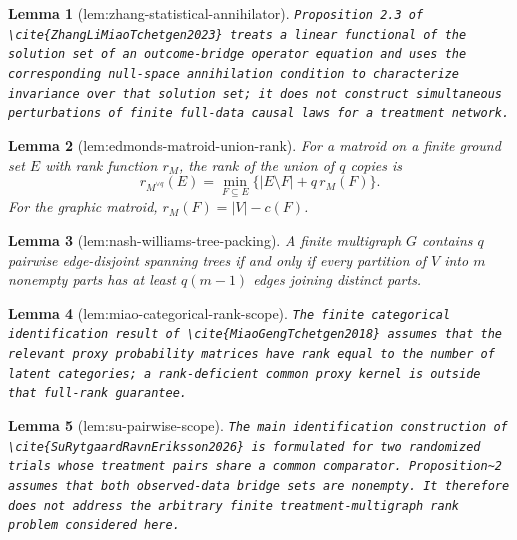 \documentclass{article}
\newtheorem{lemma}{Lemma}
\begin{document}
\begin{lemma}[lem:zhang-statistical-annihilator]\label{lem:zhang-statistical-annihilator}
\texttt{Proposition 2.3 of \textbackslash{}\allowbreak{}cite\{ZhangLiMiaoTchetgen2023\}\allowbreak{} treats a linear functional of the solution set of an outcome-\allowbreak{}bridge operator equation and uses the corresponding null-\allowbreak{}space annihilation condition to characterize invariance over that solution set;\allowbreak{} it does not construct simultaneous perturbations of finite full-\allowbreak{}data causal laws for a treatment network.}
\end{lemma}

\begin{lemma}[lem:edmonds-matroid-union-rank]\label{lem:edmonds-matroid-union-rank}
For a matroid on a finite ground set \(E\) with rank function \(r_M\), the rank of the union of \(q\) copies is
\[
r_{M^{\vee q}}(E)=\min_{F\subseteq E}\{|E\setminus F|+q\,r_M(F)\}.
\]
For the graphic matroid, \(r_M(F)=|V|-c(F)\).
\end{lemma}

\begin{lemma}[lem:nash-williams-tree-packing]\label{lem:nash-williams-tree-packing}
A finite multigraph \(G\) contains \(q\) pairwise edge-disjoint spanning trees if and only if every partition of \(V\) into \(m\) nonempty parts has at least \(q(m-1)\) edges joining distinct parts.
\end{lemma}

\begin{lemma}[lem:miao-categorical-rank-scope]\label{lem:miao-categorical-rank-scope}
\texttt{The finite categorical identification result of \textbackslash{}\allowbreak{}cite\{MiaoGengTchetgen2018\}\allowbreak{} assumes that the relevant proxy probability matrices have rank equal to the number of latent categories;\allowbreak{} a rank-\allowbreak{}deficient common proxy kernel is outside that full-\allowbreak{}rank guarantee.}
\end{lemma}

\begin{lemma}[lem:su-pairwise-scope]\label{lem:su-pairwise-scope}
\texttt{The main identification construction of \textbackslash{}\allowbreak{}cite\{SuRytgaardRavnEriksson2026\}\allowbreak{} is formulated for two randomized trials whose treatment pairs share a common comparator.  Proposition\textasciitilde{}2 assumes that both observed-\allowbreak{}data bridge sets are nonempty.  It therefore does not address the arbitrary finite treatment-\allowbreak{}multigraph rank problem considered here.}
\end{lemma}
\end{document}

